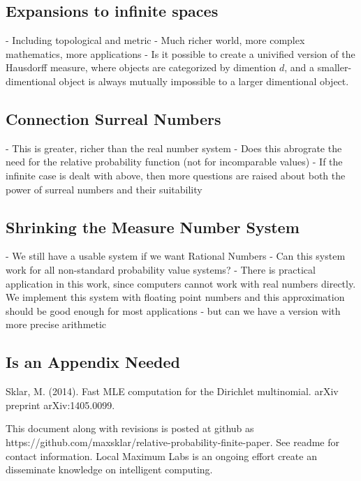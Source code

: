 \documentclass[twoside]{article}
\begin{document}
\subsection{Expansions to infinite spaces}
- Including topological and metric
- Much richer world, more complex mathematics, more applications
- Is it possible to create a univified version of the Hausdorff measure, where objects are categorized by dimention \(d\), and a smaller-dimentional object is always mutually impossible to a larger dimentional object.
\subsection{Connection Surreal Numbers}
- This is greater, richer than the real number system
- Does this abrograte the need for the relative probability function (not for incomparable values)
- If the infinite case is dealt with above, then more questions are raised about both the power of surreal numbers and their suitability
\subsection{Shrinking the Measure Number System}
- We still have a usable system if we want Rational Numbers
- Can this system work for all non-standard probability value systems?
- There is practical application in this work, since computers cannot work with real numbers directly. We implement this system with floating point numbers and this approximation should be good enough for most applications - but can we have a version with more precise arithmetic

\begin{appendices}

\section{Is an Appendix Needed}

\end{appendices}


\begin{thebibliography}{20}

Sklar, M. (2014). Fast MLE computation for the Dirichlet multinomial. arXiv preprint arXiv:1405.0099.

\end{thebibliography}

This document along with revisions is posted at github as https://github.com/maxsklar/relative-probability-finite-paper. See readme for contact information. Local Maximum Labs is an ongoing effort create an disseminate knowledge on intelligent computing.
\end{document}
